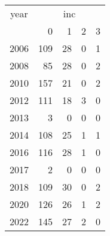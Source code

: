 \footnotesize\begin{tabular}[t]{lrrrr}
\toprule
\multicolumn{1}{c}{year} & \multicolumn{4}{c}{inc} \\
\cmidrule(l{3pt}r{3pt}){1-1} \cmidrule(l{3pt}r{3pt}){2-5}
  & 0 & 1 & 2 & 3\\
\midrule
2006 & 109 & 28 & 0 & 1\\
2008 & 85 & 28 & 0 & 2\\
2010 & 157 & 21 & 0 & 2\\
2012 & 111 & 18 & 3 & 0\\
2013 & 3 & 0 & 0 & 0\\
2014 & 108 & 25 & 1 & 1\\
2016 & 116 & 28 & 1 & 0\\
2017 & 2 & 0 & 0 & 0\\
2018 & 109 & 30 & 0 & 2\\
2020 & 126 & 26 & 1 & 2\\
2022 & 145 & 27 & 2 & 0\\
\bottomrule
\end{tabular}
